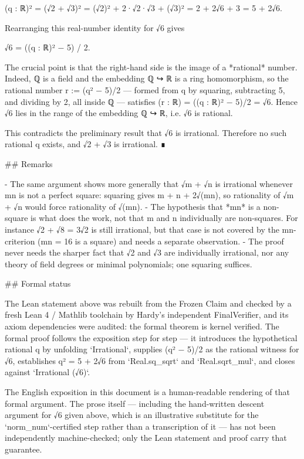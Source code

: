\documentclass[11pt]{article}
\begin{document}
    (q : ℝ)² = (√2 + √3)²
            = (√2)² + 2·√2·√3 + (√3)²
            = 2 + 2√6 + 3
            = 5 + 2√6.

Rearranging this real-number identity for √6 gives

    √6 = ((q : ℝ)² − 5) / 2.

The crucial point is that the right-hand side is the image of a *rational* number. Indeed, ℚ is a field and the embedding ℚ ↪ ℝ is a ring homomorphism, so the rational number r := (q² − 5)/2 — formed from q by squaring, subtracting 5, and dividing by 2, all inside ℚ — satisfies (r : ℝ) = ((q : ℝ)² − 5)/2 = √6. Hence √6 lies in the range of the embedding ℚ ↪ ℝ, i.e. √6 is rational.

This contradicts the preliminary result that √6 is irrational. Therefore no such rational q exists, and √2 + √3 is irrational. ∎

\#\# Remarks

- The same argument shows more generally that √m + √n is irrational whenever mn is not a perfect square: squaring gives m + n + 2√(mn), so rationality of √m + √n would force rationality of √(mn).
- The hypothesis that *mn* is a non-square is what does the work, not that m and n individually are non-squares. For instance √2 + √8 = 3√2 is still irrational, but that case is not covered by the mn-criterion (mn = 16 is a square) and needs a separate observation.
- The proof never needs the sharper fact that √2 and √3 are individually irrational, nor any theory of field degrees or minimal polynomials; one squaring suffices.

\#\# Formal status

The Lean statement above was rebuilt from the Frozen Claim and checked by a fresh Lean 4 / Mathlib toolchain by Hardy's independent FinalVerifier, and its axiom dependencies were audited: the formal theorem is kernel verified. The formal proof follows the exposition step for step — it introduces the hypothetical rational q by unfolding `Irrational`, supplies (q² − 5)/2 as the rational witness for √6, establishes q² = 5 + 2√6 from `Real.sq\_sqrt` and `Real.sqrt\_mul`, and closes against `Irrational (√6)`.

The English exposition in this document is a human-readable rendering of that formal argument. The prose itself — including the hand-written descent argument for √6 given above, which is an illustrative substitute for the `norm\_num`-certified step rather than a transcription of it — has not been independently machine-checked; only the Lean statement and proof carry that guarantee.
\end{document}
